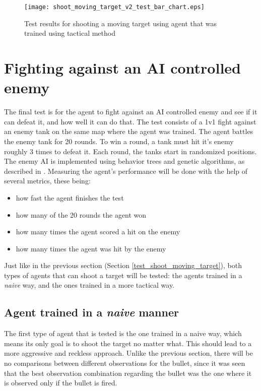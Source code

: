 \begin{figure}
    \begin{center}
        \texttt{[image: shoot\_moving\_target\_v2\_test\_bar\_chart.eps]}
        \caption{Test results for shooting a moving target using agent that was trained using tactical method}
        \label{test_results_shoot_moving_target_v2_bar_chart}
    \end{center}
\end{figure}


\section{Fighting against an AI controlled enemy} \label{test_fight_tank}

The final test is for the agent to fight against an AI controlled enemy and see if it can defeat it, and how well it can do that. The test consists of a 1v1 fight against an enemy tank on the same map where the agent was trained. The agent battles the enemy tank for 20 rounds. To win a round, a tank must hit it's enemy roughly 3 times to defeat it. Each round, the tanks start in randomized positions. The enemy AI is implemented using behavior trees and genetic algorithms, as described in \cite{paduraru2019automatic}. Measuring the agent's performance will be done with the help of several metrics, these being:
\begin{itemize}
    \item how fast the agent finishes the test
    \item how many of the 20 rounds the agent won
    \item how many times the agent scored a hit on the enemy
    \item how many times the agent was hit by the enemy
\end{itemize}

Just like in the previous section (Section \ref{test_shoot_moving_target}), both types of agents that can shoot a target will be tested: the agents trained in a \emph{naive} way, and the ones trained in a more tactical way.

\subsection{Agent trained in a \emph{naive} manner}

The first type of agent that is tested is the one trained in a naive way, which means its only goal is to shoot the target no matter what. This should lead to a more aggressive and reckless approach. Unlike the previous section, there will be no comparisons between different observations for the bullet, since it was seen that the best observation combination regarding the bullet was the one where it is observed only if the bullet is fired.


